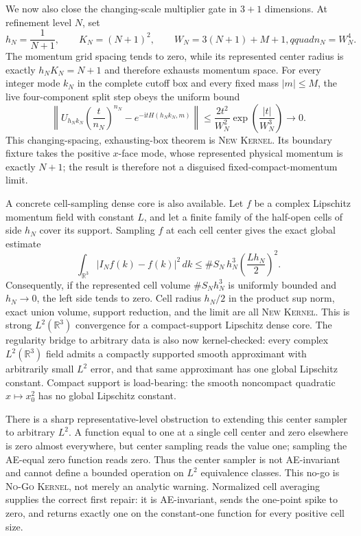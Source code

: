 \documentclass[11pt]{article}
\newcommand{\Kernel}{\textcolor{kernelcolor}{\textsc{Kernel}}}
\newcommand{\NewResult}{\textsc{New}}
\newcommand{\NoGo}{\textsc{No-Go}}
\newcommand{\ii}{\mathrm{i}}
\begin{document}
  We now also close the changing-scale multiplier gate in $3+1$ dimensions.
  At refinement level $N$, set
  \begin{equation}\label{eq:scaledgrid}
    h_N=\frac{1}{N+1},\qquad K_N=(N+1)^2,\qquad
    W_N=3(N+1)+M+1,qquad n_N=W_N^4.
  \end{equation}
  The momentum grid spacing tends to zero, while its represented center radius
  is exactly $h_NK_N=N+1$ and therefore exhausts momentum space.  For every
  integer mode $k_N$ in the complete cutoff box and every fixed mass
  $|m|\leq M$, the live four-component split step obeys the uniform bound
  \begin{equation}\label{eq:scaledlivebound}
    \left\|U_{h_Nk_N}\!\left(\frac{t}{n_N}\right)^{n_N}
      -e^{-\ii tH(h_Nk_N,m)}\right\|
    \leq \frac{2t^2}{W_N^2}
      \exp\!\left(\frac{|t|}{W_N^3}\right)
    \longrightarrow0.
  \end{equation}
  This changing-spacing, exhausting-box theorem is \NewResult{} \Kernel{}.
  Its boundary fixture takes the positive $x$-face mode, whose represented
  physical momentum is exactly $N+1$; the result is therefore not a disguised
  fixed-compact-momentum limit.

  A concrete cell-sampling dense core is also available.  Let $f$ be a
  complex Lipschitz momentum field with constant $L$, and let a finite family
  of the half-open cells of side $h_N$ cover its support.  Sampling $f$ at each
  cell center gives the exact global estimate
  \begin{equation}\label{eq:cellsamplingrate}
    \int_{\mathbb R^3}|I_Nf(k)-f(k)|^2\,dk
      \leq \#S_N\,h_N^3\left(\frac{Lh_N}{2}\right)^2.
  \end{equation}
  Consequently, if the represented cell volume $\#S_Nh_N^3$ is uniformly
  bounded and $h_N\to0$, the left side tends to zero.  Cell radius $h_N/2$ in
  the product sup norm, exact union volume, support reduction, and the limit
  are all \NewResult{} \Kernel{}.  This is strong $L^2(\mathbb R^3)$ convergence
  for a compact-support Lipschitz dense core.  The regularity bridge to
  arbitrary data is also now kernel-checked: every complex $L^2(\mathbb R^3)$
  field admits a compactly supported smooth approximant with arbitrarily small
  $L^2$ error, and that same approximant has one global Lipschitz constant.
  Compact support is load-bearing: the smooth noncompact quadratic
  $x\mapsto x_0^2$ has no global Lipschitz constant.

  There is a sharp representative-level obstruction to extending this center
  sampler to arbitrary $L^2$.  A function equal to one at a single cell center
  and zero elsewhere is zero almost everywhere, but center sampling reads the
  value one; sampling the AE-equal zero function reads zero.  Thus the center
  sampler is not AE-invariant and cannot define a bounded operation on $L^2$
  equivalence classes.  This no-go is \NoGo{} \Kernel{}, not merely an
  analytic warning.  Normalized cell averaging supplies the correct first
  repair: it is AE-invariant, sends the one-point spike to zero, and returns
  exactly one on the constant-one function for every positive cell size.
\end{document}
